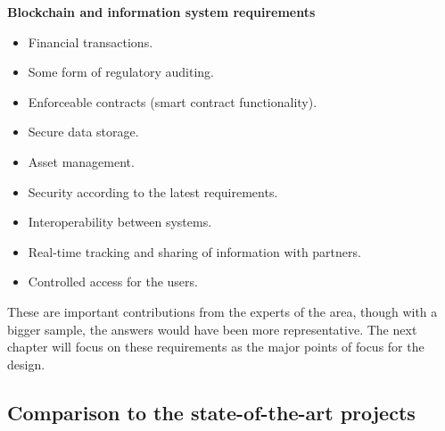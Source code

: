 \par \textbf{Blockchain and information system requirements}
\begin{itemize}
    \item Financial transactions.
    \item Some form of regulatory auditing.
    \item Enforceable contracts (smart contract functionality).
    \item Secure data storage.
    \item Asset management.
    \item Security according to the latest requirements.
    \item Interoperability between systems.
    \item Real-time tracking and sharing of information with partners.
    \item Controlled access for the users.
\end{itemize}

These are important contributions from the experts of the area, though with a bigger sample, the answers would have been more representative. The next chapter will focus on these requirements as the major points of focus for the design.


\subsection{Comparison to the state-of-the-art projects}
